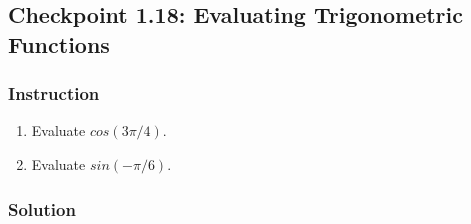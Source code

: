 \subsection*{Checkpoint 1.18: Evaluating Trigonometric Functions}

\subsubsection*{Instruction}

\begin{enumerate}[label=(\alph*)]
  \item
    Evaluate $ cos(3\pi/4) $.
  \item
    Evaluate $ sin(-\pi/6) $.
\end{enumerate}

\subsubsection*{Solution}

